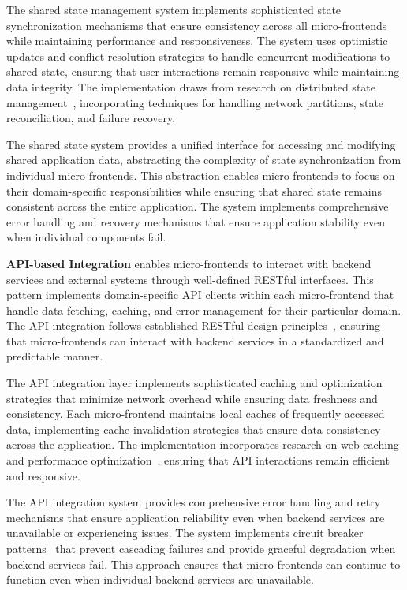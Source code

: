\documentclass[12pt,a4paper]{report}
\begin{document}
The shared state management system implements sophisticated state synchronization mechanisms that ensure consistency across all micro-frontends while maintaining performance and responsiveness. The system uses optimistic updates and conflict resolution strategies to handle concurrent modifications to shared state, ensuring that user interactions remain responsive while maintaining data integrity. The implementation draws from research on distributed state management~\cite{brewer2012cap}, incorporating techniques for handling network partitions, state reconciliation, and failure recovery.

The shared state system provides a unified interface for accessing and modifying shared application data, abstracting the complexity of state synchronization from individual micro-frontends. This abstraction enables micro-frontends to focus on their domain-specific responsibilities while ensuring that shared state remains consistent across the entire application. The system implements comprehensive error handling and recovery mechanisms that ensure application stability even when individual components fail.

\textbf{API-based Integration} enables micro-frontends to interact with backend services and external systems through well-defined RESTful interfaces. This pattern implements domain-specific API clients within each micro-frontend that handle data fetching, caching, and error management for their particular domain. The API integration follows established RESTful design principles~\cite{fielding2000architectural}, ensuring that micro-frontends can interact with backend services in a standardized and predictable manner.

The API integration layer implements sophisticated caching and optimization strategies that minimize network overhead while ensuring data freshness and consistency. Each micro-frontend maintains local caches of frequently accessed data, implementing cache invalidation strategies that ensure data consistency across the application. The implementation incorporates research on web caching and performance optimization~\cite{google2021web}, ensuring that API interactions remain efficient and responsive.

The API integration system provides comprehensive error handling and retry mechanisms that ensure application reliability even when backend services are unavailable or experiencing issues. The system implements circuit breaker patterns~\cite{hystrix2012circuit} that prevent cascading failures and provide graceful degradation when backend services fail. This approach ensures that micro-frontends can continue to function even when individual backend services are unavailable.
\end{document}
